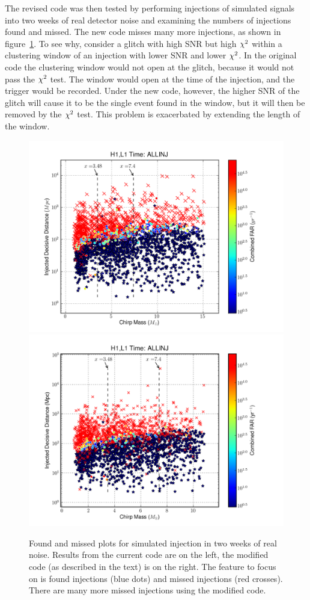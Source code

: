 The revised code was then tested by performing injections of simulated
signals into two weeks of real detector noise and examining the
numbers of injections found and missed.  The new code misses many more
injections, as shown in figure~\ref{f:found_missed_penguins}.  To see
why, consider a glitch with high SNR but high $\chi^2$ within a
clustering window of an injection with lower SNR and lower $\chi^2$.
In the original code the clustering window would not open at the
glitch, because it would not pass the $\chi^2$ test.  The window would
open at the time of the injection, and the trigger would be recorded.
Under the new code, however, the higher SNR of the glitch will cause
it to be the single event found in the window, but it will then be
removed by the $\chi^2$ test.  This problem is exacerbated by
extending the length of the window.

\begin{figure}
  \includegraphics[width=0.5\linewidth]{figures/detchar/penguin_foundmissed_orig}
  \includegraphics[width=0.5\linewidth]{figures/detchar/penguin_foundmissed_new}
  \caption[Found/missed plots showing the effect of new code] {
  \label{f:found_missed_penguins}
Found and missed plots for simulated injection in two weeks of real
noise.  Results from the current code are on the left, the modified
code (as described in the text) is on the right.  The feature to focus
on is found injections (blue dots) and missed injections (red
crosses).  There are many more missed injections using the modified
code.
}
\end{figure}%


